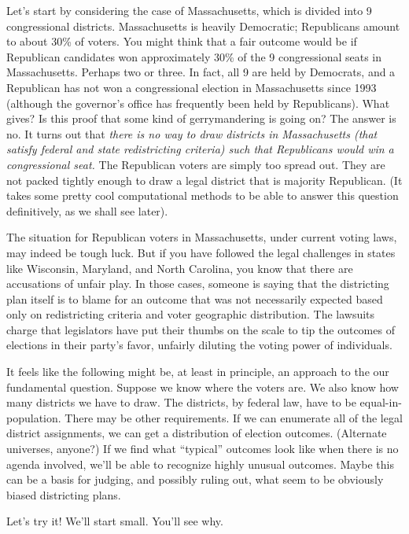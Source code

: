 \documentclass[
  openany]{book}
\begin{document}
Let's start by considering the case of Massachusetts, which is divided into 9 congressional districts. Massachusetts is heavily Democratic; Republicans amount to about 30\% of voters. You might think that a fair outcome would be if Republican candidates won approximately 30\% of the 9 congressional seats in Massachusetts. Perhaps two or three. In fact, all 9 are held by Democrats, and a Republican has not won a congressional election in Massachusetts since 1993 (although the governor's office has frequently been held by Republicans). What gives? Is this proof that some kind of gerrymandering is going on? The answer is no. It turns out that \emph{there is no way to draw districts in Massachusetts (that satisfy federal and state redistricting criteria) such that Republicans would win a congressional seat.} The Republican voters are simply too spread out. They are not packed tightly enough to draw a legal district that is majority Republican. (It takes some pretty cool computational methods to be able to answer this question definitively, as we shall see later).

The situation for Republican voters in Massachusetts, under current voting laws, may indeed be tough luck. But if you have followed the legal challenges in states like Wisconsin, Maryland, and North Carolina, you know that there are accusations of unfair play. In those cases, someone is saying that the districting plan itself is to blame for an outcome that was not necessarily expected based only on redistricting criteria and voter geographic distribution. The lawsuits charge that legislators have put their thumbs on the scale to tip the outcomes of elections in their party's favor, unfairly diluting the voting power of individuals.

It feels like the following might be, at least in principle, an approach to the our fundamental question. Suppose we know where the voters are. We also know how many districts we have to draw. The districts, by federal law, have to be equal-in-population. There may be other requirements. If we can enumerate all of the legal district assignments, we can get a distribution of election outcomes. (Alternate universes, anyone?) If we find what ``typical'' outcomes look like when there is no agenda involved, we'll be able to recognize highly unusual outcomes. Maybe this can be a basis for judging, and possibly ruling out, what seem to be obviously biased districting plans.

Let's try it! We'll start small. You'll see why.
\end{document}

